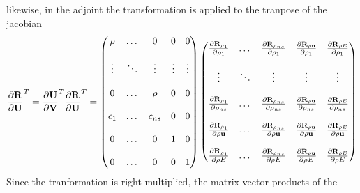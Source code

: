 likewise, in the adjoint the transformation is applied to the tranpose of the 
jacobian
\begin{equation}
  \begin{aligned}
    \frac{\partial \mathbf R}{\partial \mathbf U}^{T} = \frac{\partial \mathbf U}{\partial \mathbf V}^{T} \frac{\partial \mathbf R}{\partial \mathbf U}^{T} =
    \begin{pmatrix}
      \rho   & \dots  & 0      &  0      & 0      \\ \\
      \vdots & \ddots & \vdots &  \vdots & \vdots \\ \\
      0      & \dots  &\rho    &  0      & 0      \\ \\
      c_1    & \dots  & c_{ns} &  0      & 0      \\ \\
      0      & \dots  & 0      &  1      & 0      \\ \\
      0      & \dots  & 0      &  0      & 1
    \end{pmatrix}
    \begin{pmatrix}
      \frac{\partial \mathbf R_{\rho_1}}{\partial \rho_1}    & \dots  & \frac{\partial \mathbf R_{\rho_{ns}}}{\partial \rho_1}    & \frac{\partial \mathbf R_{\rho \mathbf u}}{\partial \rho_1}    & \frac{\partial \mathbf R_{\rho E}}{\partial \rho_1} \\ \\
      \vdots                    & \ddots & \vdots                       & \vdots                      & \vdots                   \\ \\
      \frac{\partial \mathbf R_{\rho_1}}{\partial \rho_{ns}} & \dots  & \frac{\partial \mathbf R_{\rho_{ns}}}{\partial \rho_{ns}} & \frac{\partial \mathbf R_{\rho \mathbf u}}{\partial \rho_{ns}} & \frac{\partial \mathbf R_{\rho E}}{\partial \rho_{ns}} \\ \\
      \frac{\partial \mathbf R_{\rho_1}}{\partial \rho \mathbf u}  & \dots  & \frac{\partial \mathbf R_{\rho_{ns}}}{\partial \rho \mathbf u}  & \frac{\partial \mathbf R_{\rho \mathbf u}}{\partial \rho \mathbf u}  & \frac{\partial \mathbf R_{\rho E}}{\partial \rho \mathbf u} \\ \\
      \frac{\partial \mathbf R_{\rho_1}}{\partial \rho E}    & \dots  & \frac{\partial \mathbf R_{\rho_{ns}}}{\partial \rho E}    & \frac{\partial \mathbf R_{\rho \mathbf u}}{\partial \rho E}    & \frac{\partial \mathbf R_{\rho E}}{\partial \rho E}
    \end{pmatrix}
  \end{aligned}
  \label{drdu-to-drdv-t}
\end{equation}
Since the tranformation is right-multiplied, the matrix vector products of the 
